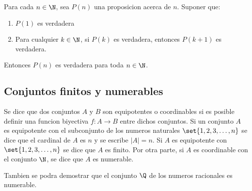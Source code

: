 Para cada \(n \in \N \), sea \(P(n )\) una proposicion acerca de \(n \). Suponer que:
\begin{enumerate}
	\item \(P(1 )\) es verdadera
	\item Para cualquier \(k \in \N \), si \(P(k )\) es verdadera, entonces \(P(k + 1 )\) es verdadera.
\end{enumerate}
Entonces \(P(n )\) es verdadera para toda \(n \in \N \).
\subsection{Conjuntos finitos y numerables}
Se dice que dos conjuntos \(A \) y \(B \) son equipotentes o coordinables si es posible definir una funcion biyectiva \(f \colon A \to B \) entre dichos conjuntos. Si un conjunto \(A \) es equipotente con el subconjunto de los numeros naturales \(\set{1,2,3,\ldots,n }\) se dice que el cardinal de \(A \) es \(n \) y se escribe \(|A| = n \). Si \(A \) es equipotente con \(\set{1,2,3,\ldots,n }\) se dice que \(A \) es finito. Por otra parte, si \(A \) es coordinable con el conjunto \(\N \), se dice que \(A \) es numerable.

Tambien se podra demostrar que el conjunto \(\Q \) de los numeros racionales es numerable.










